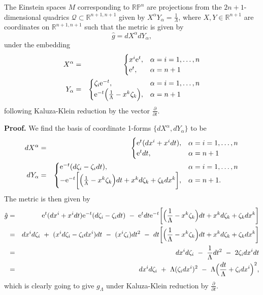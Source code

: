\begin{prop}
The Einstein spaces $M$ corresponding to $\mathbb{RP}^{n}$
are projections from the $2n+1$-dimensional quadrics $\mathcal{Q}\subset\mathbb{R}^{n+1,n+1}$
given by $X^{\alpha}Y_{\alpha}=\frac{1}{\Lambda}$, where $X,Y\in\mathbb{R}^{n+1}$
are coordinates on $\mathbb{R}^{n+1,n+1}$ such that the metric is
given by 
\[
\hat{g}= dX^{\alpha} dY_{\alpha},
\]
 under the embedding
\begin{eqnarray}
X^{\alpha} & = & \begin{cases}
x^{i}\mathrm{e}^{t}, & \alpha=i=1,\dots,n\\
\mathrm{e}^{t}, & \alpha=n+1
\end{cases}\nonumber \\
Y_{\alpha} & = & \begin{cases}
\zeta_{i}\mathrm{e}^{-t}, & \alpha=i=1,\dots,n\\
\mathrm{e}^{-t}\Bigl(\frac{1}{\Lambda}-x^{k}\zeta_{k}\Bigr), & \alpha=n+1
\end{cases}\label{eq:embedding-1}
\end{eqnarray}
following Kaluza-Klein reduction by the vector $\frac{\partial}{\partial t}.$
\end{prop}
\textbf{Proof. }We find the basis of coordinate 1-forms $\{ dX^{\alpha}, dY_{\alpha}\}$
to be
\begin{eqnarray*}
 dX^{\alpha} & = & \begin{cases}
\mathrm{e}^{t}( dx^{i}+x^{i} dt), & \alpha=i=1,\dots,n\\
\mathrm{e}^{t} dt, & \alpha=n+1
\end{cases}\\
 dY_{\alpha} & = & \begin{cases}
\mathrm{e}^{-t}( d\zeta_{i}-\zeta_{i} dt), & \alpha=i=1,\dots,n\\
-\mathrm{e}^{-t}\biggl[\Bigl(\frac{1}{\Lambda}-x^{k}\zeta_{k}\Bigr) dt+x^{k} d\zeta_{k}+\zeta_{k} dx^{k}\biggr], & \alpha=n+1.
\end{cases}
\end{eqnarray*}
The metric is then given by
\begin{eqnarray*}
\hat{g} & = & \mathrm{e}^{t}( dx^{i}+x^{i} dt)\mathrm{e}^{-t}( d\zeta_{i}-\zeta_{i} dt)\ -\ \mathrm{e}^{t} dt\mathrm{e}^{-t}\biggl[\Bigl(\frac{1}{\Lambda}-x^{k}\zeta_{k}\Bigr) dt+x^{k} d\zeta_{k}+\zeta_{k} dx^{k}\biggr]\\
 & = &  dx^{i} d\zeta_{i}\ +\ (x^{i} d\zeta_{i}-\zeta_{i} dx^{i}) dt\ -\ (x^{i}\zeta_{i}) dt^{2}\ -\  dt\biggl[\Bigl(\frac{1}{\Lambda}-x^{k}\zeta_{k}\Bigr) dt+x^{k} d\zeta_{k}+\zeta_{k} dx^{k}\biggr]\\
 & = &  dx^{i} d\zeta_{i}\ -\ \frac{1}{\Lambda} dt^{2}\ -\ 2\zeta_{i} dx^{i} dt\\
 & = &  dx^{i} d\zeta_{i}\ +\ \Lambda(\zeta_{i} dx^{i})^{2}\ -\ \Lambda\Bigl(\frac{ dt}{\Lambda}+\zeta_{i} dx^{i}\Bigr)^{2},
\end{eqnarray*}
which is clearly going to give $g_{\Lambda}$ under Kaluza-Klein reduction
by $\frac{\partial}{\partial t}$.
\koniec

